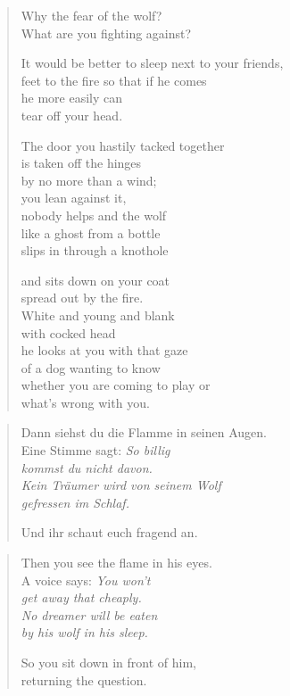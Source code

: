 \begin{verse}

Why the fear of the wolf?\\
What are you fighting against?

It would be better to sleep next to your friends,\\
feet to the fire so that if he comes\\
he more easily can\\
tear off your head.

The door you hastily tacked together\\
is taken off the hinges\\
by no more than a wind;\\
you lean against it,\\
nobody helps and the wolf\\
like a ghost from a bottle\\
slips in through a knothole

and sits down on your coat\\
spread out by the fire.\\
White and young and blank\\
with cocked head\\
he looks at you with that gaze\\
of a dog wanting to know\\
whether you are coming to play or\\
what's wrong with you.

\end{verse}

\clearpage

\begin{verse}

Dann siehst du die Flamme in seinen Augen.\\
Eine Stimme sagt: {\itshape So billig\\
kommst du nicht davon.\\
Kein Träumer wird von seinem Wolf\\
gefressen im Schlaf.}

Und ihr schaut euch fragend an.

\end{verse}

\clearpage

\begin{verse}
Then you see the flame in his eyes.\\
A voice says: {\itshape You won't\\
get away that cheaply.\\
No dreamer will be eaten\\
by his wolf in his sleep.}

So you sit down in front of him,\\
returning the question.

\end{verse}
